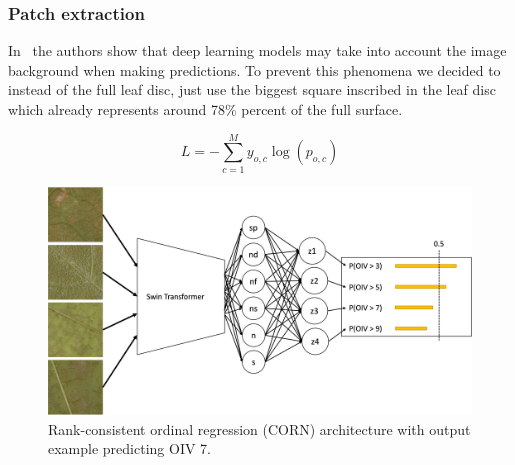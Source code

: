 \documentclass[english]{article}
\begin{document}
\subsubsection{Patch extraction}
In~\parencite{leeNewPerspectivesPlant2020} the authors show that deep learning models may take into account the image background when making predictions. To prevent this phenomena we decided to instead of the full leaf disc, just use the biggest square inscribed in the leaf disc which already represents around 78\% percent of the full surface.














\begin{equation}
    L = -\sum_{c=1}^My_{o,c}\log(p_{o,c})\label{fml:crossentropy}
\end{equation}

\begin{figure}[H]
    \centering
    \includegraphics[width=0.9\linewidth]{p_viticola/resources/images/2023_a_oiv_bin_corn.png}
    \caption{Rank-consistent ordinal regression (CORN) architecture with output example predicting OIV 7.}
    \label{fig:corn}
\end{figure}
\end{document}
